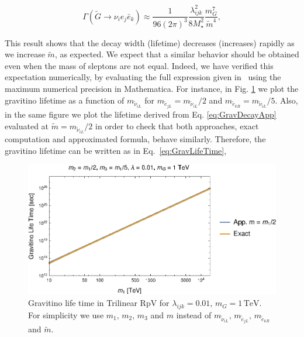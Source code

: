 \documentclass[a4paper,11pt]{article}
\begin{document}
\begin{equation}
\Gamma(\tilde{G}\rightarrow\nu_{i}e_{j}\bar{e}_{k})\approx\frac{1}{96(2\pi)^{3}}\frac{\lambda_{ijk}^{2}}{8M_{\star}^{2}}\frac{m_{G}^{7}}{\tilde{m}^{4}},\label{eq:GravDecayApp}
\end{equation}

This result shows that the decay width
(lifetime) decreases (increases) rapidly as we increase $\tilde{m}$,
as expected. We expect that a similar behavior should be obtained
even when the mass of sleptons are not equal. Indeed, we have verified this expectation numerically, by evaluating
the full expression given in~\cite{Moreau:2001sr} using the maximum numerical
precision in Mathematica. For instance, in Fig. \ref{fig:Gravitino-life-time}
we plot the gravitino lifetime as a function of $m_{\tilde{\nu}_{iL}}$
for $m_{\tilde{e}_{jL}}=m_{\tilde{\nu}_{iL}}/2$ and $m_{\tilde{e}_{kR}}=m_{\tilde{\nu}_{iL}}/5$.
Also, in the same figure we plot the lifetime derived from Eq. \ref{eq:GravDecayApp}
evaluated at $\tilde{m}=m_{\tilde{\nu}_{iL}}/2$ in order to check
that both approaches, exact computation and approximated formula,
behave similarly. Therefore, the gravitino lifetime can be written as in Eq.~\ref{eq:GravLifeTime},

\begin{figure}
\begin{centering}
\includegraphics[scale=1.2]{Figures/GravitinoDecaym1m2m3Final}
\par\end{centering}

\caption{\label{fig:Gravitino-life-time}Gravitino life time in Trilinear RpV
for $\lambda_{ijk}=0.01,\,m_{G}=1\,\mbox{TeV}$. For simplicity we
use $m_{1},\,m_{2},\,m_{3}$ and $m$ instead of $m_{\tilde{\nu}_{iL}},\,m_{\tilde{e}_{jL}},\,m_{\tilde{e}_{kR}}$
and $\tilde{m}$.}
\end{figure}
\end{document}
